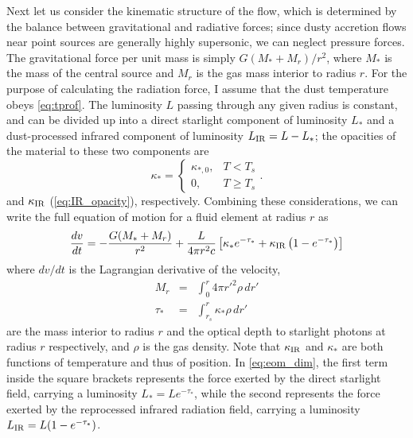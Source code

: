 \documentclass[useAMS,usenatbib]{mn2e}
\begin{document}
Next let us consider the kinematic structure of the flow, which is determined by the balance between gravitational and radiative forces; since dusty accretion flows near point sources are generally highly supersonic, we can neglect pressure forces. The gravitational force per unit mass is simply $G (M_* + M_r)/r^2$, where $M_*$ is the mass of the central source and $M_r$ is the gas mass interior to radius $r$. For the purpose of calculating the radiation force, I assume that the dust temperature obeys \autoref{eq:tprof}. The luminosity $L$ passing through any given radius is constant, and can be divided up into a direct starlight component of luminosity $L_*$ and a dust-processed infrared component of luminosity $L_{\rm IR} = L - L_*$; the opacities of the material to these two components are
\begin{equation}
\kappa_* =
\left\{
\begin{array}{ll}
\kappa_{*,0}, & T < T_s \\
0, & T \geq T_s
\end{array}
\right..
\end{equation}
and $\kappa_{\rm IR}$ (\autoref{eq:IR_opacity}), respectively. Combining these considerations, we can write the full equation of motion for a fluid element at radius $r$ as
\begin{equation}
\frac{dv}{dt} = -\frac{G(M_*+M_r)}{r^2} + \frac{L}{4\pi r^2 c}  \left[\kappa_* e^{-\tau_*} + \kappa_{\rm IR} \left(1 - e^{-\tau_*}\right)\right]
\label{eq:eom_dim}
\end{equation}
where $dv/dt$ is the Lagrangian derivative of the velocity,
\begin{eqnarray}
M_r & = & \int_0^r 4\pi r'^2 \rho \, dr' \\
\tau_* & = & \int_{r_s}^r \kappa_* \rho \, dr'
\end{eqnarray}
are the mass interior to radius $r$ and the optical depth to starlight photons at radius $r$ respectively, and $\rho$ is the gas density. Note that $\kappa_{\rm IR}$ and $\kappa_*$ are both functions of temperature and thus of position. In \autoref{eq:eom_dim}, the first term inside the square brackets represents the force exerted by the direct starlight field, carrying a luminosity $L_* = Le^{-\tau_*}$, while the second represents the force exerted by the reprocessed infrared radiation field, carrying a luminosity $L_{\rm IR} = L(1-e^{-\tau_*})$. 
\end{document}

